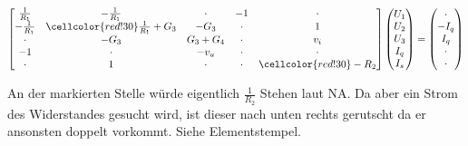 \[
\begin{bmatrix}
    \frac{1}{R_1} & -\frac{1}{R_1} & \cdot & -1 & \cdot \\
    -\frac{1}{R_1} & \cellcolor{red!30}\frac{1}{R_1} + G_3 & - G_3 & \cdot & 1 \\
    \cdot & -G_3 & G_3 + G_4 & \cdot & v_i \\
    -1 & \cdot & -v_u & \cdot & \cdot \\ 
    \cdot & 1 & \cdot & \cdot &\cellcolor{red!30}-R_2\\
\end{bmatrix} 
\begin{pmatrix}
    U_1 \\
    U_2 \\
    U_3 \\
    I_q \\
    I_s \\
\end{pmatrix}
=
\begin{pmatrix}
    \cdot \\
    -I_q \\
    I_q \\
    \cdot \\
    \cdot \\
\end{pmatrix}
\]

An der markierten Stelle würde eigentlich $\frac{1}{R_2}$ Stehen laut NA.
Da aber ein Strom des Widerstandes gesucht wird, ist dieser nach unten rechts gerutscht da er ansonsten doppelt vorkommt. 
Siehe Elementstempel.
